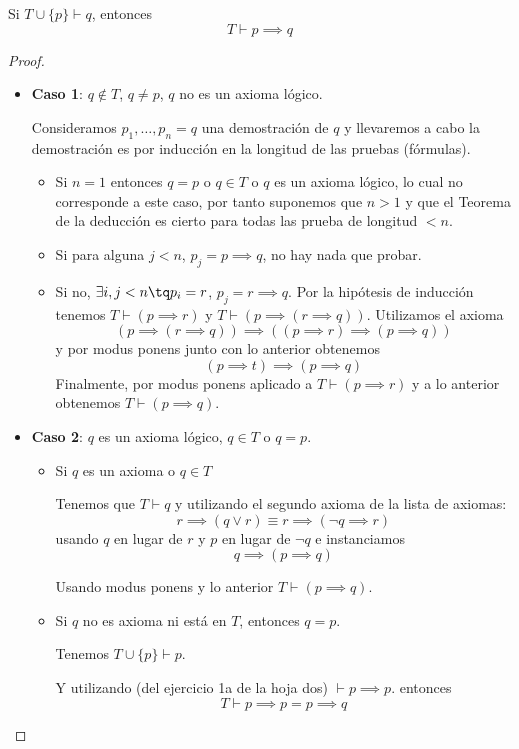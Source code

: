 \begin{theorem}
	Si $T\cup\{p\}\vdash q$, entonces $$T\vdash p\implies q$$
\end{theorem}
\begin{proof}
	\begin{itemize}
		\item \textbf{Caso 1}: $q\notin T$, $q\neq p$, $q$ no es un axioma lógico.

		Consideramos $p_1,\hdots, p_n=q$ una demostración de $q$ y llevaremos a cabo la demostración es por inducción en la longitud de las pruebas (fórmulas).

		\begin{itemize}
			\item Si $n=1$ entonces $q=p$ o $q\in T$ o $q$ es un axioma lógico, lo cual no corresponde a este caso, por tanto suponemos que $n>1$ y que el Teorema de la deducción es cierto para todas las prueba de longitud $<n$.
			\item Si para alguna $j<n$, $p_j = p\implies q$, no hay nada que probar.
			\item Si no, $\exists i,j<n \tq p_i=r$, $p_j=r\implies q$. Por la hipótesis de inducción tenemos $T\vdash (p\implies r)$ y $T\vdash (p\implies (r\implies q))$.
			Utilizamos el axioma
			$$(p\implies (r\implies q)) \implies ((p\implies r)\implies (p\implies q))$$
			y por modus ponens junto con lo anterior obtenemos
			$$(p\implies t)\implies (p\implies q)$$
			Finalmente, por modus ponens aplicado a $T\vdash (p\implies r)$ y a lo anterior obtenemos $T\vdash (p\implies q)$.
		\end{itemize}
	\item \textbf{Caso 2}: $q$ es un axioma lógico, $q\in T$ o $q=p$.

	\begin{itemize}
		\item Si $q$ es un axioma o $q\in T$

		Tenemos que $T\vdash q$ y utilizando el segundo axioma de la lista de axiomas:
		$$r\implies (q \vee r) \equiv r\implies (\neg q \implies r)$$ usando $q$ en lugar de $r$ y $p$ en lugar de $\neg q$ e instanciamos
		$$q\implies(p\implies q)$$

		Usando modus ponens y lo anterior
		$T\vdash (p\implies q)$.

		\item Si $q$ no es axioma ni está en $T$, entonces $q = p$.

		Tenemos $T\cup\{p\}\vdash p$.

		Y utilizando (del ejercicio 1a de la hoja dos) $\vdash p\implies p$.
		entonces $$T\vdash p\implies p = p\implies q$$
	\end{itemize}
	\end{itemize}
\end{proof}


